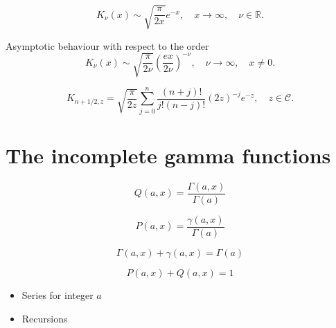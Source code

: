 \documentclass[10pt,a4paper,oneside]{article}
\numberwithin{equation}{section}
\begin{document}
\begin{equation}\label{besselk_x_to_inf}
K_{\nu}(x) \sim \sqrt{\frac{\pi}{2x}} e^{-x}, \quad x \to \infty, \quad \nu \in \mathbb{R}.
\end{equation}

Asymptotic behaviour with respect to the order
\begin{equation}\label{besselk_order_to_inf}
K_{\nu}(x) \sim \sqrt{\frac{\pi}{2\nu}}\left(\frac{ex}{2\nu}\right)^{-\nu}, \quad \nu \to \infty, \quad x \neq 0.
\end{equation}

\begin{equation}\label{besselk_half}
K_{n + 1/2, z} = \sqrt{\frac{\pi}{2z}} \sum_{j=0}^n \frac{(n + j)!}{j! (n-j)!} (2z)^{-j}e^{-z}, \quad z\in \mathcal{C}.
\end{equation}

\section{The incomplete gamma functions}\label{appendix_incomplete_gamma}

\begin{equation}
Q(a, x) = \frac{\Gamma(a, x)}{\Gamma(a)}
\end{equation}

\begin{equation}
P(a, x) = \frac{\gamma(a, x)}{\Gamma(a)}
\end{equation}

\begin{equation}
\Gamma(a, x) + \gamma(a, x) = \Gamma(a)
\end{equation}

\begin{equation}
P(a, x) + Q(a, x) = 1
\end{equation}

\begin{itemize}
\item Series for integer $a$
\item Recursions
\end{itemize}



\end{document}

